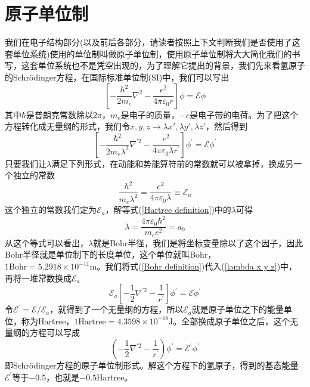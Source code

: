 \documentclass[12pt,a4paper,openany,twoside]{book}
\numberwithin{equation}{section}
\newcommand{\sch}{Schr\"odinger}
\begin{document}
      \section{原子单位制}
        我们在电子结构部分(以及前后各部分，请读者按照上下文判断我们是否使用了这套单位系统)使用的单位制叫做原子单位制，使用原子单位制将大大简化我们的书写，这套单位系统也不是凭空出现的，为了理解它提出的背景，我们先来看氢原子的\sch 方程，在国际标准单位制(SI)中，我们可以写出
        \begin{equation}
          \left[ - \frac { \hbar ^ { 2 } } { 2 m _ { e } } \nabla ^ { 2 } - \frac { e ^ { 2 } } { 4 \pi \varepsilon _ { 0 } r } \right] \phi = \mathscr { E } \phi
        \end{equation}
        其中$\hbar$是普朗克常数除以$2\pi$，$m_e$是电子的质量，$-e$是电子带的电荷。为了把这个方程转化成无量纲的形式，我们令$x,y,z\rightarrow\lambda x',\lambda y',\lambda z'$，然后得到
        \begin{equation}
          \left[ - \frac { \hbar ^ { 2 } } { 2 m _ { e } \lambda ^ { 2 } } \nabla ^ { \prime 2 } - \frac { e ^ { 2 } } { 4 \pi \varepsilon _ { 0 } \lambda r ^ { \prime } } \right] \phi ^ { \prime } = \mathscr { E } \phi ^ { \prime }
          \label{lambda x y z}
        \end{equation}
        只要我们让$\lambda$满足下列形式，在动能和势能算符前的常数就可以被拿掉，换成另一个独立的常数
        \begin{equation}
          \frac { \hbar ^ { 2 } } { m _ { e } \lambda ^ { 2 } } = \frac { e ^ { 2 } } { 4 \pi \varepsilon _ { 0 } \lambda }\equiv \mathscr { E } _ { a }
          \label{Hartree definition}
        \end{equation}
        这个独立的常数我们定为$ \mathscr { E } _ { a }$，解等式(\ref{Hartree definition})中的$\lambda$可得
        \begin{equation}
          \lambda=\frac{4\pi\varepsilon_0\hbar^2}{m_e e^2}=a_0
          \label{Bohr definition}
        \end{equation}
        从这个等式可以看出，$\lambda$就是Bohr半径，我们是将坐标变量除以了这个因子，因此Bohr半径就是单位制下的长度单位，这个单位就叫Bohr，$1 \text{Bohr} = 5.2918 \times 10^{-11} \textrm{m}$。我们将式(\ref{Bohr definition})代入(\ref{lambda x y z})中，再将一堆常数换成$\mathscr{E}_a$
        \begin{equation}
          \mathscr { E } _ { a } \left[ - \frac { 1 } { 2 } \nabla ^ { \prime 2 } - \frac { 1 } { r ^ { \prime } } \right] \phi ^ { \prime } = \mathscr { E } \phi ^ { \prime }
        \end{equation}
        令$\mathscr{E}^{\prime}=\mathscr{E}/\mathscr{E}_a$，就得到了一个无量纲的方程，所以$\mathscr{E}_a$就是原子单位之下的能量单位，称为Hartree，$1 \text{Hartree} = 4.3598 \times 10^{-18} \textrm{J}$。全部换成原子单位之后，这个无量纲的方程可以写成
        \begin{equation}
          \left( - \frac { 1 } { 2 } \nabla ^ { \prime 2 } - \frac { 1 } { r ^ { \prime } } \right) \phi ^ { \prime } = \mathscr { E } ^ { \prime } \phi ^ { \prime }
        \end{equation}
        即\sch 方程的原子单位制形式。解这个方程下的氢原子，得到的基态能量$\mathscr{E}^{\prime}$等于$-0.5$，也就是$-0.5$Hartree。
\end{document}
